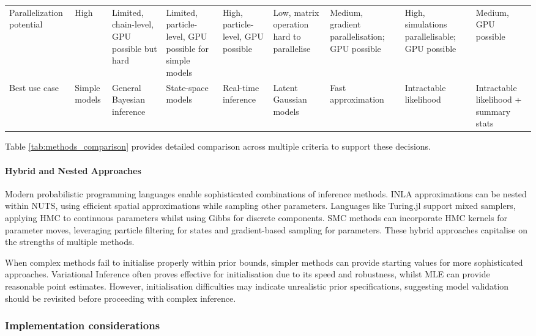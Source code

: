 \documentclass{article}
\begin{document}
\begin{landscape}
\begin{table}[ht]
\begin{tabular}{@{}p{3.2cm}p{1.5cm}p{1.5cm}p{1.5cm}p{1.5cm}p{1.5cm}p{1.5cm}p{1.5cm}p{1.5cm}@{}}
Parallelization potential & 
High & 
Limited, chain-level, GPU possible but hard & 
Limited, particle-level, GPU possible for simple models & 
High, particle-level, GPU possible & 
Low, matrix operation hard to parallelise & 
Medium, gradient parallelisation; GPU possible & 
High, simulations parallelisable; GPU possible & 
Medium, GPU possible \\
Best use case & Simple models & General Bayesian inference & State-space models & Real-time inference & Latent Gaussian models & Fast approximation & Intractable likelihood & Intractable likelihood + summary stats \\
\bottomrule
\end{tabular}
\end{table}
\end{landscape}

Table \ref{tab:methods_comparison} provides detailed comparison across multiple criteria to support these decisions.

\paragraph{Hybrid and Nested Approaches}

Modern probabilistic programming languages enable sophisticated combinations of inference methods.
INLA approximations can be nested within NUTS, using efficient spatial approximations while sampling other parameters.
Languages like Turing.jl support mixed samplers, applying HMC to continuous parameters whilst using Gibbs for discrete components.
SMC methods can incorporate HMC kernels for parameter moves, leveraging particle filtering for states and gradient-based sampling for parameters.
These hybrid approaches capitalise on the strengths of multiple methods.

When complex methods fail to initialise properly within prior bounds, simpler methods can provide starting values for more sophisticated approaches.
Variational Inference often proves effective for initialisation due to its speed and robustness, whilst MLE can provide reasonable point estimates.
However, initialisation difficulties may indicate unrealistic prior specifications, suggesting model validation should be revisited before proceeding with complex inference.

\subsubsection{Implementation considerations}
\end{document}
